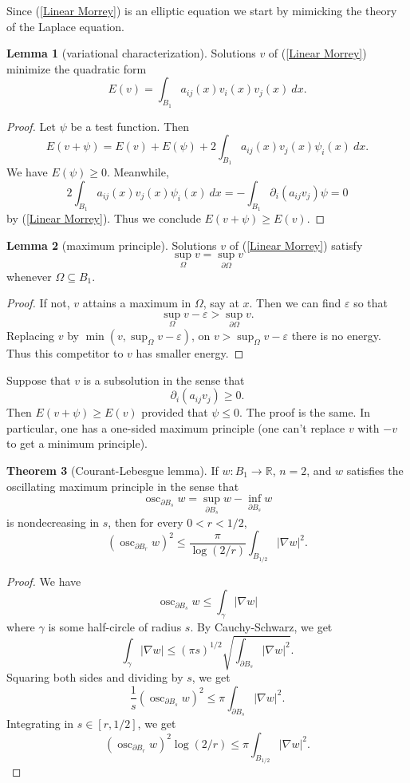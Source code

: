 \documentclass[12pt]{book}
\newcommand{\RR}{\mathbb{R}}
\DeclareMathOperator{\osc}{osc}
\theoremstyle{definition}
\newtheorem{theorem}{Theorem}[chapter]
\newtheorem{lemma}[theorem]{Lemma}
\begin{document}
Since (\ref{Linear Morrey}) is an elliptic equation we start by mimicking the theory of the Laplace equation.

\begin{lemma}[variational characterization]
Solutions $v$ of (\ref{Linear Morrey}) minimize the quadratic form
$$E(v) = \int_{B_1} a_{ij}(x)v_i(x)v_j(x) ~dx.$$
\end{lemma}
\begin{proof}
Let $\psi$ be a test function. Then
$$E(v + \psi) = E(v) + E(\psi) + 2\int_{B_1} a_{ij}(x)v_j(x)\psi_i(x) ~dx.$$
We have $E(\psi) \geq 0$. Meanwhile,
$$2\int_{B_1} a_{ij}(x)v_j(x)\psi_i(x) ~dx = -\int_{B_1} \partial_i(a_{ij}v_j)\psi = 0$$
by (\ref{Linear Morrey}).
Thus we conclude $E(v + \psi) \geq E(v)$.
\end{proof}

\begin{lemma}[maximum principle]
Solutions $v$ of (\ref{Linear Morrey}) satisfy
$$\sup_\Omega v = \sup_{\partial \Omega} v$$
whenever $\Omega \subseteq B_1$.
\end{lemma}
\begin{proof}
If not, $v$ attains a maximum in $\Omega$, say at $x$.
Then we can find $\varepsilon$ so that
$$\sup_\Omega v - \varepsilon > \sup_{\partial \Omega} v.$$
Replacing $v$ by $\min(v, \sup_\Omega v - \varepsilon)$, on $v > \sup_\Omega v - \varepsilon$ there is no energy.
Thus this competitor to $v$ has smaller energy.
\end{proof}

Suppose that $v$ is a subsolution in the sense that
$$\partial_i(a_{ij}v_j) \geq 0.$$
Then $E(v + \psi) \geq E(v)$ provided that $\psi \leq 0$.
The proof is the same.
In particular, one has a one-sided maximum principle (one can't replace $v$ with $-v$ to get a minimum principle).

\begin{theorem}[Courant-Lebesgue lemma]
If $w: B_1 \to \RR$, $n = 2$, and $w$ satisfies the oscillating maximum principle in the sense that
$$\osc_{\partial B_s} w = \sup_{\partial B_s} w - \inf_{\partial B_s} w$$
is nondecreasing in $s$, then for every $0 < r < 1/2$,
$$\left(\osc_{\partial B_r} w\right)^2 \leq \frac{\pi}{\log(2/r)} \int_{B_{1/2}} |\nabla w|^2.$$
\end{theorem}
\begin{proof}
We have
$$\osc_{\partial B_s} w \leq \int_\gamma |\nabla w|$$
where $\gamma$ is some half-circle of radius $s$. By Cauchy-Schwarz, we get
$$\int_\gamma |\nabla w| \leq (\pi s)^{1/2} \sqrt{\int_{\partial B_s} |\nabla w|^2}.$$
Squaring both sides and dividing by $s$, we get
$$\frac{1}{s} \left(\osc_{\partial B_s} w \right)^2 \leq \pi \int_{\partial B_s} |\nabla w|^2.$$
Integrating in $s \in [r, 1/2]$, we get
$$\left(\osc_{\partial B_r} w\right)^2 \log(2/r) \leq \pi \int_{B_{1/2}} |\nabla w|^2.$$
\end{proof}
\end{document}
